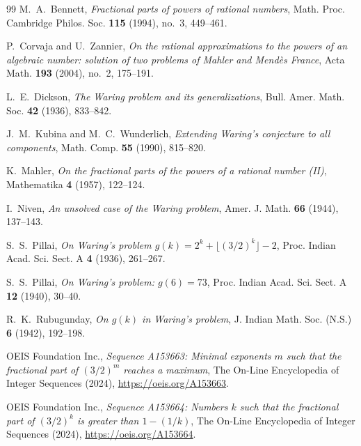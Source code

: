\documentclass[11pt,reqno]{amsart}
\theoremstyle{definition}
\numberwithin{equation}{section}
\begin{document}
\begin{thebibliography}{99}
\small
{}
M.~A.~Bennett, \emph{Fractional parts of powers of rational numbers}, Math. Proc. Cambridge Philos. Soc. \textbf{115} (1994), no.~3, 449--461.

P.~Corvaja and U.~Zannier, \emph{On the rational approximations to the powers of an algebraic number: solution of two problems of Mahler and Mendès France}, Acta Math. \textbf{193} (2004), no.~2, 175--191.

L.~E.~Dickson, \emph{The Waring problem and its generalizations}, Bull. Amer. Math. Soc. \textbf{42} (1936), 833--842.

J.~M.~Kubina and M.~C.~Wunderlich, \emph{Extending Waring's conjecture to all components}, Math. Comp. \textbf{55} (1990), 815--820.

K.~Mahler, \emph{On the fractional parts of the powers of a rational number (II)}, Mathematika \textbf{4} (1957), 122--124.

I.~Niven, \emph{An unsolved case of the Waring problem}, Amer. J. Math. \textbf{66} (1944), 137--143.

S.~S.~Pillai, \emph{On Waring's problem $g(k) = 2^k + \lfloor(3/2)^k\rfloor - 2$}, Proc. Indian Acad. Sci. Sect. A \textbf{4} (1936), 261--267.

S.~S.~Pillai, \emph{On Waring's problem: $g(6) = 73$}, Proc. Indian Acad. Sci. Sect. A \textbf{12} (1940), 30--40.

R.~K.~Rubugunday, \emph{On $g(k)$ in Waring's problem}, J. Indian Math. Soc. (N.S.) \textbf{6} (1942), 192--198.

OEIS Foundation Inc., \emph{Sequence A153663: Minimal exponents $m$ such that the fractional part of $(3/2)^m$ reaches a maximum}, The On-Line Encyclopedia of Integer Sequences (2024), \url{https://oeis.org/A153663}.

OEIS Foundation Inc., \emph{Sequence A153664: Numbers $k$ such that the fractional part of $(3/2)^k$ is greater than $1 - (1/k)$}, The On-Line Encyclopedia of Integer Sequences (2024), \url{https://oeis.org/A153664}.
\end{thebibliography}
\end{document}
